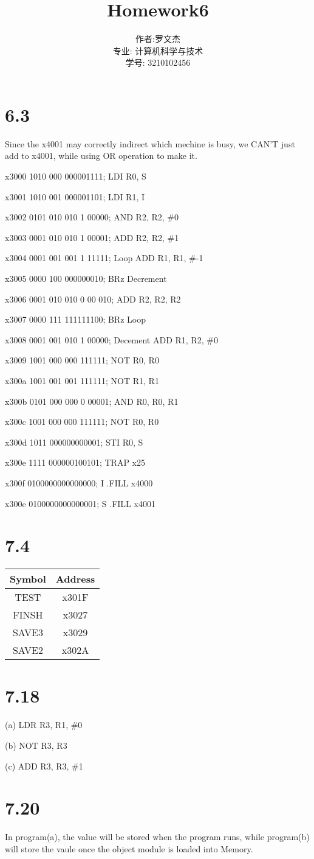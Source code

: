 \documentclass[20pt]{ctexart}
\title{Homework6}
\author{作者:罗文杰\\专业: 计算机科学与技术\\学号: 3210102456}
\date{}
\begin{document}
\maketitle

\section*{6.3}
Since the x4001 may correctly indirect which mechine is busy, we CAN'T just add to x4001, while using OR operation to make it.

x3000 1010 000 000001111; LDI R0, S 

x3001 1010 001 000001101; LDI R1, I 

x3002 0101 010 010 1 00000; AND R2, R2, \#0 

x3003 0001 010 010 1 00001; ADD R2, R2, \#1 

x3004 0001 001 001 1 11111; Loop ADD R1, R1, \#-1 

x3005 0000 100 000000010; BRz Decrement 

x3006 0001 010 010 0 00 010; ADD R2, R2, R2 

x3007 0000 111 111111100; BRz Loop 

x3008 0001 001 010 1 00000; Decement ADD R1, R2, \#0 

x3009 1001 000 000 111111; NOT R0, R0 

x300a 1001 001 001 111111; NOT R1, R1 

x300b 0101 000 000 0 00001; AND R0, R0, R1 

x300c 1001 000 000 111111; NOT R0, R0 

x300d 1011 000000000001; STI R0, S 

x300e 1111 000000100101; TRAP x25 

x300f 0100000000000000; I .FILL x4000 

x300e 0100000000000001; S .FILL x4001

\section*{7.4}
\begin{table}[H]
    \centering
    \begin{tabular}{|c|c|}
        \hline
        Symbol & Address  \\
        \hline
        TEST & x301F \\
        \hline
        FINSH & x3027 \\
        \hline  
        SAVE3 & x3029 \\
        \hline          
        SAVE2 & x302A \\
        \hline
        \end{tabular}
        \end{table}

\section*{7.18}
(a) LDR  R3, R1, \#0

(b) NOT  R3, R3

(c) ADD  R3, R3, \#1

\section*{7.20}
In program(a), the value will be stored when the program runs, while program(b) will store the vaule once the object module is loaded into Memory. 


\end{document}
